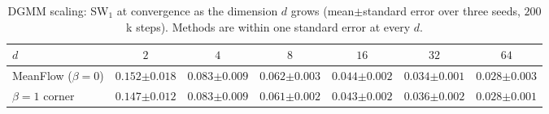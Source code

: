 \begin{table}[t]
    \centering
    \caption{DGMM scaling: SW$_1$ at convergence as the dimension $d$ grows (mean$\pm$standard error over three seeds, $200$k steps). Methods are within one standard error at every $d$.}
    \label{tab: dgmm-scale}
    \begin{tabular}{lcccccc}
        \toprule
        $d$ & $2$ & $4$ & $8$ & $16$ & $32$ & $64$ \\
        \midrule
        MeanFlow ($\beta\!=\!0$)  & $0.152{\scriptstyle\pm0.018}$ & $\mathbf{0.083}{\scriptstyle\pm0.009}$ & $0.062{\scriptstyle\pm0.003}$ & $0.044{\scriptstyle\pm0.002}$ & $\mathbf{0.034}{\scriptstyle\pm0.001}$ & $\mathbf{0.028}{\scriptstyle\pm0.003}$ \\
        $\beta\!=\!1$ corner       & $\mathbf{0.147}{\scriptstyle\pm0.012}$ & $0.083{\scriptstyle\pm0.009}$ & $\mathbf{0.061}{\scriptstyle\pm0.002}$ & $\mathbf{0.043}{\scriptstyle\pm0.002}$ & $0.036{\scriptstyle\pm0.002}$ & $0.028{\scriptstyle\pm0.001}$ \\
        \bottomrule
    \end{tabular}
\end{table}
